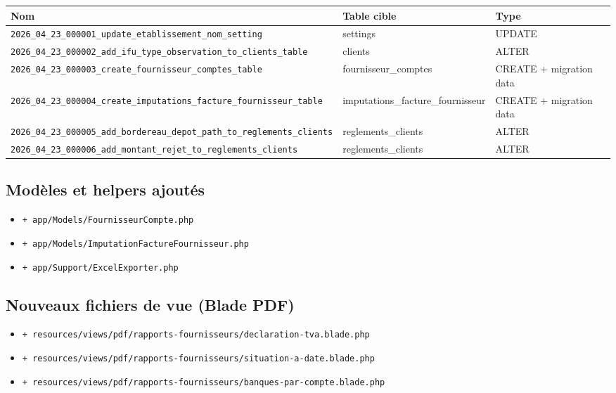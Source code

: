 \documentclass[11pt,a4paper]{article}
\newcommand{\newfile}[1]{\texttt{\small\textcolor{accent}{+ #1}}}
\begin{document}
\begin{longtable}{@{}>{\raggedright\arraybackslash}p{} l l@{}}
  \toprule
  \textbf{Nom} & \textbf{Table cible} & \textbf{Type} \\
  \midrule \endhead
  \texttt{2026\_04\_23\_000001\_update\_etablissement\_nom\_setting} & settings & UPDATE \\
  \texttt{2026\_04\_23\_000002\_add\_ifu\_type\_observation\_to\_clients\_table} & clients & ALTER \\
  \texttt{2026\_04\_23\_000003\_create\_fournisseur\_comptes\_table} & fournisseur\_comptes & CREATE + migration data \\
  \texttt{2026\_04\_23\_000004\_create\_imputations\_facture\_fournisseur\_table} & imputations\_facture\_fournisseur & CREATE + migration data \\
  \texttt{2026\_04\_23\_000005\_add\_bordereau\_depot\_path\_to\_reglements\_clients} & reglements\_clients & ALTER \\
  \texttt{2026\_04\_23\_000006\_add\_montant\_rejet\_to\_reglements\_clients} & reglements\_clients & ALTER \\
  \bottomrule
\end{longtable}

\subsection{Modèles et helpers ajoutés}

\begin{itemize}[leftmargin=1.4em]
  \item \newfile{app/Models/FournisseurCompte.php}
  \item \newfile{app/Models/ImputationFactureFournisseur.php}
  \item \newfile{app/Support/ExcelExporter.php}
\end{itemize}

\subsection{Nouveaux fichiers de vue (Blade PDF)}

\begin{itemize}[leftmargin=1.4em]
  \item \newfile{resources/views/pdf/rapports-fournisseurs/declaration-tva.blade.php}
  \item \newfile{resources/views/pdf/rapports-fournisseurs/situation-a-date.blade.php}
  \item \newfile{resources/views/pdf/rapports-fournisseurs/banques-par-compte.blade.php}
\end{itemize}
\end{document}

